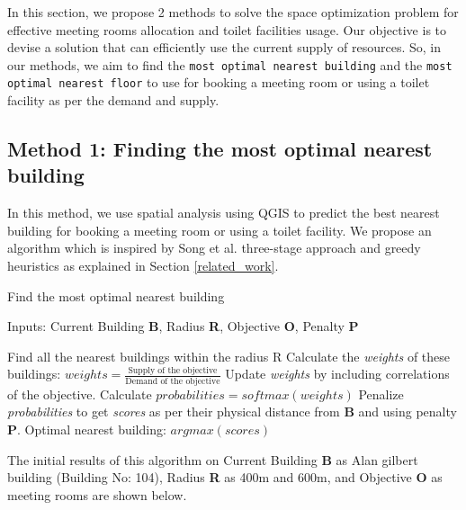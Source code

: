 In this section, we propose 2 methods to solve the space optimization problem for effective meeting rooms allocation and toilet facilities usage. Our objective is to devise a solution that can efficiently use the current supply of resources. So, in our methods, we aim to find the \texttt{most optimal nearest building} and the \texttt{most optimal nearest floor} to use for booking a meeting room or using a toilet facility as per the demand and supply. 

\subsection{Method 1: Finding the most optimal nearest building}
In this method, we use spatial analysis using QGIS to predict the best nearest building for booking a meeting room or using a toilet facility. We propose an algorithm which is inspired by Song et al.\cite{song2018iterated} three-stage approach and greedy heuristics as explained in Section \ref{related_work}. 

{
\begin{algorithm}
  \caption{Find the most optimal nearest building}
  Inputs: Current Building \textbf{B}, Radius \textbf{R}, Objective \textbf{O}, Penalty \textbf{P}
  \begin{algorithmic}[1]
    \STATE Find all the nearest buildings within the radius R
    \STATE Calculate the \textit{weights} of these buildings: $weights = \frac{\text{Supply of the objective}}{\text{Demand of the objective}}$
    \STATE Update \textit{weights} by including correlations of the objective. 
    \STATE Calculate $probabilities = softmax(weights)$
    \STATE Penalize \textit{probabilities} to get \textit{scores} as per their physical distance from \textbf{B} and using penalty \textbf{P}.
    \STATE Optimal nearest building: $argmax(scores)$
  \end{algorithmic}
\end{algorithm}
}

The initial results of this algorithm on Current Building \textbf{B} as Alan gilbert building (Building No: 104), Radius \textbf{R} as 400m and 600m, and Objective \textbf{O} as meeting rooms are shown below.

